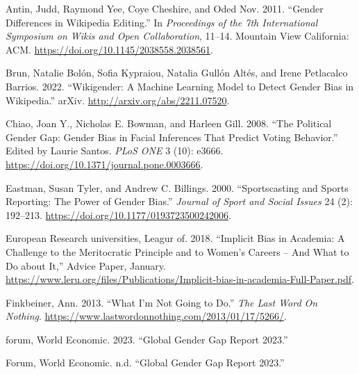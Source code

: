 \documentclass[
]{article}
\newlength{\cslhangindent}
\newlength{\cslentryspacingunit} %
\newenvironment{CSLReferences}[2] %
 {%
  \setlength{\parindent}{0pt}
  \ifodd #1
  \let\oldpar\par
  \def\par{\hangindent=\cslhangindent\oldpar}
  \fi
  \setlength{\parskip}{#2\cslentryspacingunit}
 }%
 {}
\begin{document}
\hypertarget{refs}{}
\begin{CSLReferences}{1}{0}
\leavevmode{}%
Antin, Judd, Raymond Yee, Coye Cheshire, and Oded Nov. 2011. {``Gender
Differences in {Wikipedia} Editing.''} In \emph{Proceedings of the 7th
{International} {Symposium} on {Wikis} and {Open} {Collaboration}},
11--14. Mountain View California: ACM.
\url{https://doi.org/10.1145/2038558.2038561}.

\leavevmode{}%
Brun, Natalie Bolón, Sofia Kypraiou, Natalia Gullón Altés, and Irene
Petlacalco Barrios. 2022. {``Wikigender: {A} {Machine} {Learning}
{Model} to {Detect} {Gender} {Bias} in {Wikipedia}.''} arXiv.
\url{http://arxiv.org/abs/2211.07520}.

\leavevmode{}%
Chiao, Joan Y., Nicholas E. Bowman, and Harleen Gill. 2008. {``The
{Political} {Gender} {Gap}: {Gender} {Bias} in {Facial} {Inferences}
That {Predict} {Voting} {Behavior}.''} Edited by Laurie Santos.
\emph{PLoS ONE} 3 (10): e3666.
\url{https://doi.org/10.1371/journal.pone.0003666}.

\leavevmode{}%
Eastman, Susan Tyler, and Andrew C. Billings. 2000. {``Sportscasting and
{Sports} {Reporting}: {The} {Power} of {Gender} {Bias}.''} \emph{Journal
of Sport and Social Issues} 24 (2): 192--213.
\url{https://doi.org/10.1177/0193723500242006}.

\leavevmode{}%
European Research universities, Leagur of. 2018. {``Implicit Bias in
Academia: {A} Challenge to the Meritocratic Principle and to Women's
Careers -- {And} What to Do about It,''} Advice {Paper}, January.
\url{https://www.leru.org/files/Publications/Implicit-bias-in-academia-Full-Paper.pdf}.

\leavevmode{}%
Finkbeiner, Ann. 2013. {``What {I}'m {Not} {Going} to {Do}.''} \emph{The
Last Word On Nothing}.
\url{https://www.lastwordonnothing.com/2013/01/17/5266/}.

\leavevmode{}%
forum, World Economic. 2023. {``Global {Gender} {Gap} {Report} 2023.''}

\leavevmode{}%
Forum, World Economic. n.d. {``Global {Gender} {Gap} {Report} 2023.''}


\end{CSLReferences}
\end{document}
